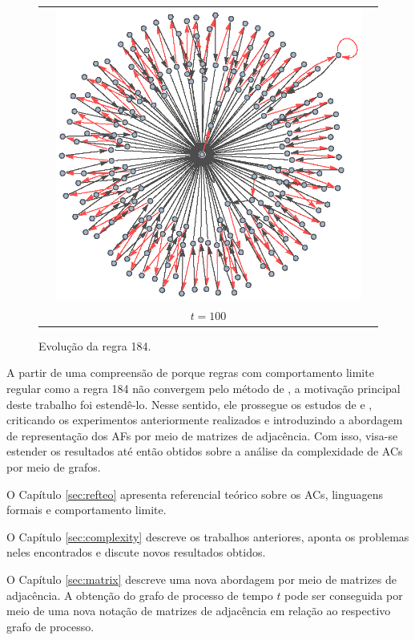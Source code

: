 \documentclass[12pt,a4paper]{article}
\begin{document}
\begin{figure}[htp]
\begin{tabular}{c c c}
& \includegraphics[scale=0.5]{img/184/100.eps} & \\
& $t = 100$ & \\
\end{tabular}
\caption{Evolução da regra 184.}
\label{fig:gp184}
\end{figure}

A partir de uma compreensão de porque regras com comportamento
limite regular como a regra 184 não convergem pelo método de
, a motivação principal deste trabalho foi
estendê-lo. Nesse sentido, ele prossegue os estudos de
 e , criticando os
experimentos anteriormente realizados e introduzindo a abordagem
de representação dos AFs por meio de matrizes de adjacência.
Com isso, visa-se estender os resultados até então obtidos
sobre a análise da complexidade de ACs por meio de grafos.

O Capítulo \ref{sec:refteo} apresenta referencial teórico sobre
os ACs, linguagens formais e comportamento limite.

O Capítulo \ref{sec:complexity} descreve os trabalhos anteriores, aponta
os problemas neles encontrados e discute novos resultados obtidos.

O Capítulo \ref{sec:matrix} descreve uma nova abordagem por meio de matrizes
de adjacência. A obtenção do
grafo de processo de tempo $t$ pode ser conseguida por meio de uma nova notação de
matrizes de adjacência em relação ao respectivo grafo de processo.
\end{document}
